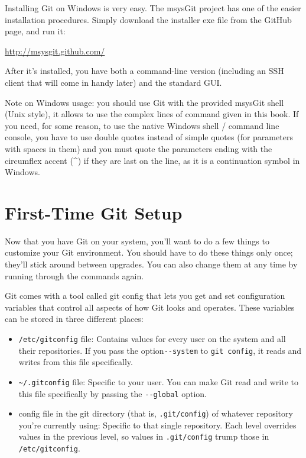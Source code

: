 \documentclass[a4paper]{book}
\begin{document}
Installing Git on Windows is very easy. The msysGit project has one of the easier installation procedures. Simply download the installer exe file from the GitHub page, and run it:

\url{http://msysgit.github.com/}

After it's installed, you have both a command-line version (including an SSH client that will come in handy later) and the standard GUI.

Note on Windows usage: you should use Git with the provided msysGit shell (Unix style), it allows to use the complex lines of command given in this book. If you need, for some reason, to use the native Windows shell / command line console, you have to use double quotes instead of simple quotes (for parameters with spaces in them) and you must quote the parameters ending with the circumflex accent (\^{}) if they are last on the line, as it is a continuation symbol in Windows.

\section{First-Time Git Setup}\label{first-time-git-setup}

Now that you have Git on your system, you'll want to do a few things to customize your Git environment. You should have to do these things only once; they'll stick around between upgrades. You can also change them at any time by running through the commands again.

Git comes with a tool called git config that lets you get and set configuration variables that control all aspects of how Git looks and operates. These variables can be stored in three different places:

\begin{itemize}
\itemsep1pt\parskip0pt
\item
  \texttt{/etc/gitconfig} file: Contains values for every user on the system and all their repositories. If you pass the option\texttt{-{}-system} to \texttt{git config}, it reads and writes from this file specifically.
\item
  \texttt{\textasciitilde{}/.gitconfig} file: Specific to your user. You can make Git read and write to this file specifically by passing the \texttt{-{}-global} option.
\item
  config file in the git directory (that is, \texttt{.git/config}) of whatever repository you're currently using: Specific to that single repository. Each level overrides values in the previous level, so values in \texttt{.git/config} trump those in \texttt{/etc/gitconfig}.
\end{itemize}
\end{document}
